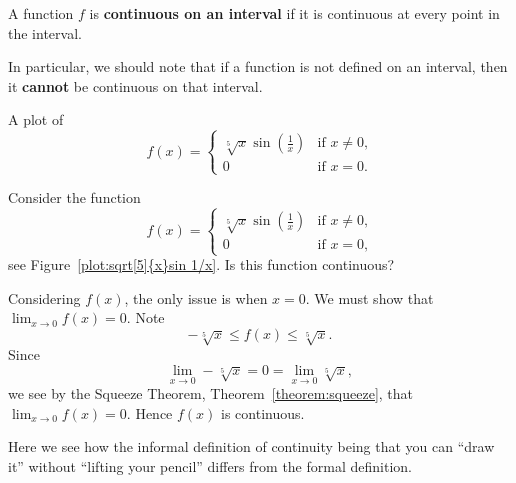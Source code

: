 \begin{definition} A function $f$ is \textbf{continuous on an interval} if it is
continuous at every point in the interval.
\end{definition}

In particular, we should note that if a function is not defined on an
interval, then it \textbf{cannot} be continuous on that interval.
\begin{marginfigure}[0in]
\caption[A continuous function.]{A plot of
\[
f(x)=
\begin{cases}
\sqrt[5]{x}\sin\left(\frac{1}{x}\right) & \text{if $x \ne 0$,}\\
 0 & \text{if $x = 0$.}
\end{cases}
\]
}
\label{plot:sqrt[5]{x}sin 1/x}
\end{marginfigure}

\begin{example}
Consider the function
\[
f(x) = 
\begin{cases}
\sqrt[5]{x}\sin\left(\frac{1}{x}\right) & \text{if $x \ne 0$,}\\
0 & \text{if $x = 0$,}
\end{cases}
\]
see Figure~\ref{plot:sqrt[5]{x}sin 1/x}. Is this function continuous?
\end{example}

\begin{solution}
Considering $f(x)$, the only issue is when $x=0$. We must show that
$\lim_{x\to 0} f(x) = 0$. Note
\[
-\sqrt[5]{x}\le f(x) \le \sqrt[5]{x}.
\]
Since
\[
\lim_{x\to 0} -\sqrt[5]{x} = 0 = \lim_{x\to 0}\sqrt[5]{x},
\]
we see by the Squeeze Theorem, Theorem~\ref{theorem:squeeze}, that
$\lim_{x\to 0} f(x) = 0$. Hence $f(x)$ is continuous.

Here we see how the informal definition of continuity being that you
can ``draw it'' without ``lifting your pencil'' differs from the
formal definition.
\end{solution}

